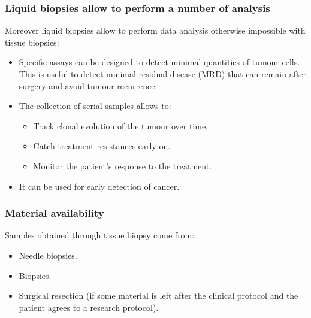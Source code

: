         \subsubsection{Liquid biopsies allow to perform a number of analysis}
        Moreover liquid biopsies allow to perform data analysis otherwise impossible with tissue biopsies:

        \begin{multicols}{2}
            \begin{itemize}
                 \item Specific assays can be designed to detect minimal quantities of tumour cells. This is useful to detect minimal residual disease (MRD) that can remain after surgery and avoid tumour recurrence.
                 \item The collection of serial samples allows to:

                     \begin{itemize}
                         \item Track clonal evolution of the tumour over time.
                         \item Catch treatment resistances early on.
                         \item Monitor the patient's response to the treatment.
                     \end{itemize}

                 \item It can be used for early detection of cancer.
             \end{itemize}
         \end{multicols}

         \subsubsection{Material availability}
         Samples obtained through tissue biopsy come from:

         \begin{multicols}{2}
             \begin{itemize}
                 \item Needle biopsies.
                 \item Biopsies.
                 \item Surgical resection (if some material is left after the clinical protocol and the patient agrees to a research protocol).
             \end{itemize}
         \end{multicols}

